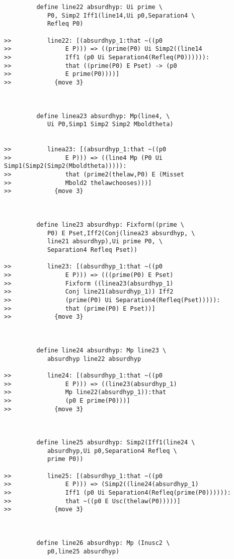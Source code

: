 \documentclass[12pt]{article}
\begin{document}
\begin{verbatim}
         define line22 absurdhyp: Ui prime \
            P0, Simp2 Iff1(line14,Ui p0,Separation4 \
            Refleq P0)

>>          line22: [(absurdhyp_1:that ~((p0
>>               E P))) => ((prime(P0) Ui Simp2((line14
>>               Iff1 (p0 Ui Separation4(Refleq(P0)))))):
>>               that ((prime(P0) E Pset) -> (p0
>>               E prime(P0))))]
>>            {move 3}



         define linea23 absurdhyp: Mp(line4, \
            Ui P0,Simp1 Simp2 Simp2 Mboldtheta)


>>          linea23: [(absurdhyp_1:that ~((p0
>>               E P))) => ((line4 Mp (P0 Ui Simp1(Simp2(Simp2(Mboldtheta))))):
>>               that (prime2(thelaw,P0) E (Misset
>>               Mbold2 thelawchooses)))]
>>            {move 3}



         define line23 absurdhyp: Fixform((prime \
            P0) E Pset,Iff2(Conj(linea23 absurdhyp, \
            line21 absurdhyp),Ui prime P0, \
            Separation4 Refleq Pset))

>>          line23: [(absurdhyp_1:that ~((p0
>>               E P))) => (((prime(P0) E Pset)
>>               Fixform ((linea23(absurdhyp_1)
>>               Conj line21(absurdhyp_1)) Iff2
>>               (prime(P0) Ui Separation4(Refleq(Pset))))):
>>               that (prime(P0) E Pset))]
>>            {move 3}



         define line24 absurdhyp: Mp line23 \
            absurdhyp line22 absurdhyp

>>          line24: [(absurdhyp_1:that ~((p0
>>               E P))) => ((line23(absurdhyp_1)
>>               Mp line22(absurdhyp_1)):that
>>               (p0 E prime(P0)))]
>>            {move 3}



         define line25 absurdhyp: Simp2(Iff1(line24 \
            absurdhyp,Ui p0,Separation4 Refleq \
            prime P0))

>>          line25: [(absurdhyp_1:that ~((p0
>>               E P))) => (Simp2((line24(absurdhyp_1)
>>               Iff1 (p0 Ui Separation4(Refleq(prime(P0)))))):
>>               that ~((p0 E Usc(thelaw(P0)))))]
>>            {move 3}



         define line26 absurdhyp: Mp (Inusc2 \
            p0,line25 absurdhyp)


\end{verbatim}
\end{document}
